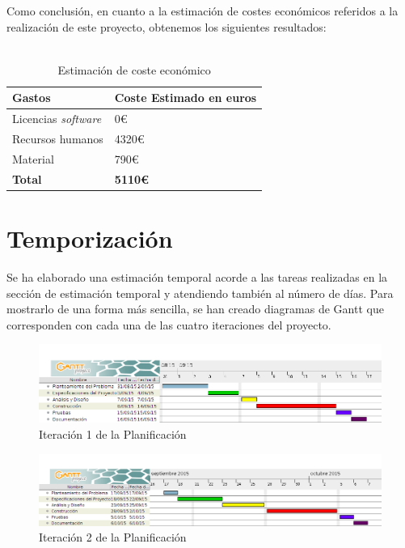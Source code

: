 Como conclusión, en cuanto a la estimación de costes económicos referidos a la realización de este proyecto, obtenemos los siguientes resultados:
\\ \\
\begin{table}[h]
\centering
\label{table:costeEstimado}
\begin{tabular}{ll}
\hline
{\bf Gastos}                   & {\bf Coste Estimado en euros} \\ \hline
Licencias \textit{software}   & 0\euro                             \\
Recursos humanos              & 4320\euro                          \\
Material                      & 790\euro                           \\
{\bf Total}                   & {\bf 5110\euro}                          \\ \hline
\end{tabular}
\caption{Estimación de coste económico}
\end{table}


\section{Temporización}
Se ha elaborado una estimación temporal acorde a las tareas realizadas en la sección de estimación temporal y atendiendo también al número de días. Para mostrarlo de una forma más sencilla, se han creado diagramas de Gantt que corresponden con cada una de las cuatro iteraciones del proyecto.

\begin{figure}[htb]
\centering
\includegraphics[width=1\textwidth]{./imagenes/iteracion1}
\caption{Iteración 1 de la Planificación} \label{fig:iteracion1}
\end{figure}

\begin{figure}[htb]
\centering
\includegraphics[width=1\textwidth]{./imagenes/iteracion2}
\caption{Iteración 2 de la Planificación} \label{fig:iteracion2}
\end{figure}

